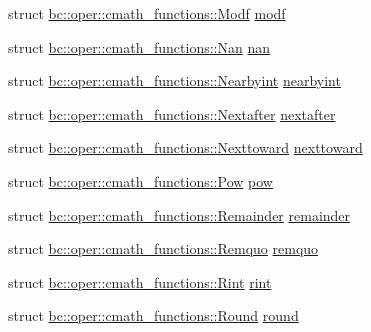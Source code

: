 \begin{DoxyCompactItemize}
\item 
struct \hyperlink{structbc_1_1oper_1_1cmath__functions_1_1Modf}{bc\+::oper\+::cmath\+\_\+functions\+::\+Modf} \hyperlink{namespacebc_1_1oper_1_1cmath__functions_aab51eba46d303ea9e4e041660b1354e5}{modf}
\item 
struct \hyperlink{structbc_1_1oper_1_1cmath__functions_1_1Nan}{bc\+::oper\+::cmath\+\_\+functions\+::\+Nan} \hyperlink{namespacebc_1_1oper_1_1cmath__functions_a68bb989c758f98c2bb3cc96d71e17bf2}{nan}
\item 
struct \hyperlink{structbc_1_1oper_1_1cmath__functions_1_1Nearbyint}{bc\+::oper\+::cmath\+\_\+functions\+::\+Nearbyint} \hyperlink{namespacebc_1_1oper_1_1cmath__functions_af026e7bba92136b53a9041f09550e9ba}{nearbyint}
\item 
struct \hyperlink{structbc_1_1oper_1_1cmath__functions_1_1Nextafter}{bc\+::oper\+::cmath\+\_\+functions\+::\+Nextafter} \hyperlink{namespacebc_1_1oper_1_1cmath__functions_aa604f2d53fbab20ce62dca783145d8df}{nextafter}
\item 
struct \hyperlink{structbc_1_1oper_1_1cmath__functions_1_1Nexttoward}{bc\+::oper\+::cmath\+\_\+functions\+::\+Nexttoward} \hyperlink{namespacebc_1_1oper_1_1cmath__functions_a2adf049e8a78243359651dea1e0b739c}{nexttoward}
\item 
struct \hyperlink{structbc_1_1oper_1_1cmath__functions_1_1Pow}{bc\+::oper\+::cmath\+\_\+functions\+::\+Pow} \hyperlink{namespacebc_1_1oper_1_1cmath__functions_ac48d604f1db405de10548e1248c5a0c7}{pow}
\item 
struct \hyperlink{structbc_1_1oper_1_1cmath__functions_1_1Remainder}{bc\+::oper\+::cmath\+\_\+functions\+::\+Remainder} \hyperlink{namespacebc_1_1oper_1_1cmath__functions_aaaeb9842d060a0157104b88e245171d8}{remainder}
\item 
struct \hyperlink{structbc_1_1oper_1_1cmath__functions_1_1Remquo}{bc\+::oper\+::cmath\+\_\+functions\+::\+Remquo} \hyperlink{namespacebc_1_1oper_1_1cmath__functions_a13b1ed9422db8f068e4668bf55e3a41b}{remquo}
\item 
struct \hyperlink{structbc_1_1oper_1_1cmath__functions_1_1Rint}{bc\+::oper\+::cmath\+\_\+functions\+::\+Rint} \hyperlink{namespacebc_1_1oper_1_1cmath__functions_ac7106c7c743ea5fe837e866301a64309}{rint}
\item 
struct \hyperlink{structbc_1_1oper_1_1cmath__functions_1_1Round}{bc\+::oper\+::cmath\+\_\+functions\+::\+Round} \hyperlink{namespacebc_1_1oper_1_1cmath__functions_a0e239f2b015efe30c46b4a7224823bbf}{round}
\item 

\end{DoxyCompactItemize}
